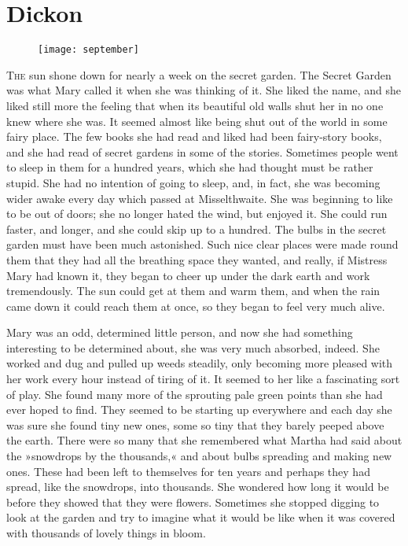 \chapter{Dickon} 
\begin{figure}[t!]
\centering
\texttt{[image: september]}
\end{figure}

 \lettrine[lines=6]{T}{he} sun shone down for nearly a week on the secret garden. The Secret Garden was what Mary called it when she was thinking of it. She liked the name, and she liked still more the feeling that when its beautiful old walls shut her in no one knew where she was. It seemed almost like being shut out of the world in some fairy place. The few books she had read and liked had been fairy-story books, and she had read of secret gardens in some of the stories. Sometimes people went to sleep in them for a hundred years, which she had thought must be rather stupid. She had no intention of going to sleep, and, in fact, she was becoming wider awake every day which passed at Misselthwaite. She was beginning to like to be out of doors; she no longer hated the wind, but enjoyed it. She could run faster, and longer, and she could skip up to a hundred. The bulbs in the secret garden must have been much astonished. Such nice clear places were made round them that they had all the breathing space they wanted, and really, if Mistress Mary had known it, they began to cheer up under the dark earth and work tremendously. The sun could get at them and warm them, and when the rain came down it could reach them at once, so they began to feel very much alive.

Mary was an odd, determined little person, and now she had something interesting to be determined about, she was very much absorbed, indeed. She worked and dug and pulled up weeds steadily, only becoming more pleased with her work every hour instead of tiring of it. It seemed to her like a fascinating sort of play. She found many more of the sprouting pale green points than she had ever hoped to find. They seemed to be starting up everywhere and each day she was sure she found tiny new ones, some so tiny that they barely peeped above the earth. There were so many that she remembered what Martha had said about the »snowdrops by the thousands,« and about bulbs spreading and making new ones. These had been left to themselves for ten years and perhaps they had spread, like the snowdrops, into thousands. She wondered how long it would be before they showed that they were flowers. Sometimes she stopped digging to look at the garden and try to imagine what it would be like when it was covered with thousands of lovely things in bloom.

